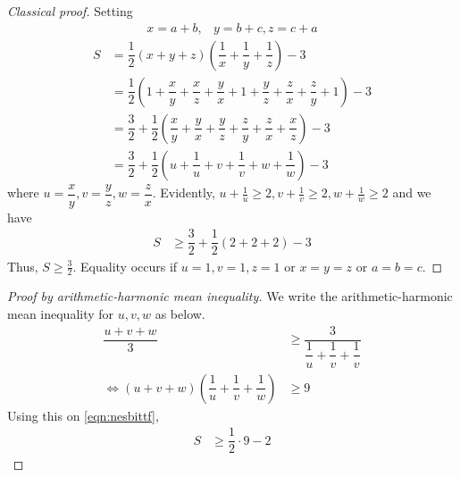 \documentclass{subfile}
\begin{document}
		\begin{proof}[\itshape Classical proof]
			Setting
				\begin{align}
					x=a+b,
						& y=b+c,z=c+a\label{eqn:nesbittsub}
				\end{align}
				\begin{align*}
					S
						& = \dfrac{1}{2}(x+y+z)\left(\dfrac{1}{x}+\dfrac{1}{y}+\dfrac{1}{z}\right)-3\\
						& = \dfrac{1}{2}\left(1+\dfrac{x}{y}+\dfrac{x}{z}+\dfrac{y}{x}+1+\dfrac{y}{z}+\dfrac{z}{x}+\dfrac{z}{y}+1\right)-3\\
						& = \dfrac{3}{2}+\dfrac{1}{2}\left(\dfrac{x}{y}+\dfrac{y}{x}+\dfrac{y}{z}+\dfrac{z}{y}+\dfrac{z}{x}+\dfrac{x}{z}\right)-3\\
						& = \dfrac{3}{2}+\dfrac{1}{2}\left(u+\dfrac{1}{u}+v+\dfrac{1}{v}+w+\dfrac{1}{w}\right)-3
				\end{align*}
			where $u=\dfrac{x}{y},v=\dfrac{y}{z},w=\dfrac{z}{x}$. Evidently, $u+\frac{1}{u}\geq2,v+\frac{1}{v}\geq2,w+\frac{1}{w}\geq2$ and we have
				\begin{align*}
					S
						& \geq\dfrac{3}{2}+\dfrac{1}{2}(2+2+2)-3
				\end{align*}
			Thus, $S\geq\frac{3}{2}$. Equality occurs if $u=1,v=1,z=1$ or $x=y=z$ or $a=b=c$.
		\end{proof}
	
		\begin{proof}[\itshape Proof by arithmetic-harmonic mean inequality]
			We write the arithmetic-harmonic mean inequality for $u,v,w$ as below.
				\begin{align*}
					\dfrac{u+v+w}{3}
						& \geq\dfrac{3}{\dfrac{1}{u}+\dfrac{1}{v}+\dfrac{1}{v}}\\
					\iff(u+v+w)\left(\dfrac{1}{u}+\dfrac{1}{v}+\dfrac{1}{w}\right)
						& \geq9
				\end{align*}
			Using this on \ref{eqn:nesbittf},
				\begin{align*}
					S
						& \geq\dfrac{1}{2}\cdot9-2
				\end{align*}
		\end{proof}
	
\end{document}

